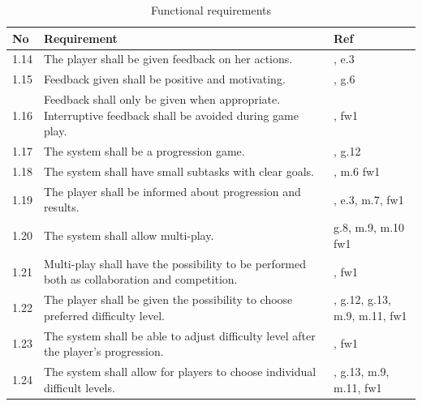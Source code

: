 \begin{table} [H]
\centering
\begin{tabular}{|>{\raggedright}p{}|p{}|p{}|}
\hline
\textbf{No} & \textbf{Requirement} & \textbf{Ref} \\ \hline
1.14 & The player shall be given feedback on her actions. &  \cite{sweetser}, e.3 \\ \hline
1.15 & Feedback given shall be positive and motivating. &  \cite{sweetser}, g.6 \\ \hline
1.16 & Feedback shall only be given when appropriate. Interruptive feedback shall be avoided during game play. &  \cite{sweetser}, fw1 \\ \hline
1.17 & The system shall be a progression game. & \cite{understandingvg} \cite{sweetser}, g.12 \\ \hline
1.18 & The system shall have small subtasks with clear goals. &  \cite{sweetser}, m.6 fw1\\ \hline
1.19 & The player shall be informed about progression and results. & \cite{sweetser}, e.3, m.7, fw1 \\ \hline
1.20 & The system shall allow multi-play. & g.8, m.9, m.10 fw1 \\ \hline
1.21 & Multi-play shall have the possibility to be performed both as collaboration and competition. & \cite{sweetser}, fw1\\ \hline
1.22 & The player shall be given the possibility to choose preferred difficulty level. & \cite{sweetser}, g.12, g.13, m.9, m.11, fw1\\ \hline
1.23 & The system shall be able to adjust difficulty level after the player's progression. & \cite{sweetser}, fw1 \\ \hline
1.24 & The system shall allow for players to choose individual difficult levels. & \cite{sweetser}, g.13, m.9, m.11, fw1\\ \hline
    \end{tabular}
    \caption[Functional requirements, part 2]{Functional requirements}
    \label{tab:func2}
\end{table} 


